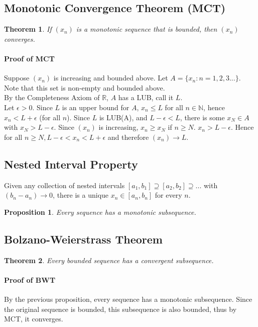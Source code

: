 \documentclass[11pt]{article}
\newcommand{\N}{{\mathbb N}}
\newcommand{\R}{{\mathbb R}}
\newtheorem {prop}{Proposition}
\newtheorem {thm}{Theorem}
\begin{document}
\subsection{Monotonic Convergence Theorem (MCT)}
\begin{thm}
If $(x_n)$ is a monotonic sequence that is bounded, then $(x_n)$ converges.
\end{thm}

\paragraph{Proof of MCT}
Suppose $(x_n)$ is increasing and bounded above. Let $A = \{x_n : n = 1 , 2 , 3 . . . \}$. Note that this set is non-empty
and bounded above.\\ By the Completeness Axiom of $\R$, $A$ has a LUB, call it $L$.\\
Let $\epsilon > 0$. Since $L$ is an upper bound for $A$, $x_n \leq L$ for all $n \in \N$, hence $x_n < L + \epsilon$ (for all $n$). 
Since $L$ is LUB(A), and $L - \epsilon < L$, there is some $x_N \in A$ with $x_N > L - \epsilon$. Since $(x_n)$ is increasing,
$x_n \geq x_N$ if $n \geq N$. $x_n > L - \epsilon$. Hence for all $n \geq N, L - \epsilon < x_n < L + \epsilon$ and therefore $(x_n) \longrightarrow L$.

\subsection{Nested Interval Property}
Given any collection of nested intervals $[a_1, b_1] \supseteq [a_2, b_2] \supseteq . . .$ with $(b_n - a_n) \longrightarrow 0$, there is a unique $x_n \in [a_n, b_n]$ for every $n$.

\begin{prop}
Every sequence has a monotonic subsequence.
\end{prop}

\subsection{Bolzano-Weierstrass Theorem}
\begin{thm}
Every bounded sequence has a convergent subsequence.
\end{thm}

\paragraph{Proof of BWT}
By the previous proposition, every sequence has a monotonic subsequence. Since the original sequence is bounded,
this subsequence is also bounded, thus by MCT, it converges.
\end{document}
